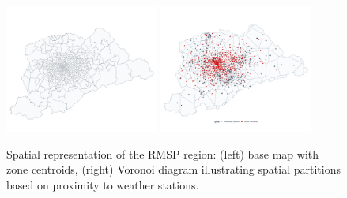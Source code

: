 \begin{figure}[H]
    \centering
    \includegraphics[width=0.45\textwidth]{../figures/rmsp_base.png}%
    \includegraphics[width=0.45\textwidth]{../figures/rmsp_voronoi.png}
    \caption{Spatial representation of the RMSP region: (left) base map with zone centroids, (right) Voronoi diagram illustrating spatial partitions based on proximity to weather stations.}
    \label{fig:rmsp_voronoi}
\end{figure}

